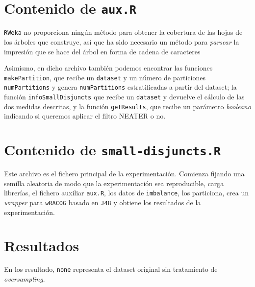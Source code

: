 \section{Contenido de \texttt{aux.R}}
\texttt{RWeka} no proporciona ningún método para obtener la cobertura de las hojas de los árboles que construye, así que
ha sido necesario un método para \textit{parsear} la impresión que se hace del árbol en forma de cadena de caracteres



Asimismo, en dicho archivo también podemos encontrar las funciones \texttt{makePartition}, que recibe un \texttt{dataset}
y un número de particiones \texttt{numPartitions} y genera \texttt{numPartitions} estratificadas a partir del dataset; la
función \texttt{infoSmallDisjuncts} que recibe un \texttt{dataset} y devuelve el cálculo de las dos medidas descritas, y 
la función \texttt{getResults}, que recibe un parámetro \textit{booleano} indicando si queremos aplicar el filtro NEATER
o no.



\section{Contenido de \texttt{small-disjuncts.R}}
Este archivo es el fichero principal de la experimentación. Comienza fijando una semilla aleatoria de modo que la experimentación
sea reproducible, carga librerías, el fichero auxiliar \texttt{aux.R}, los datos de \texttt{imbalance}, los particiona,
crea un \textit{wrapper} para \texttt{wRACOG} basado en \texttt{J48} y obtiene los resultados de la experimentación.

\section{Resultados}
En los resultado, \texttt{none} representa el dataset original sin tratamiento de \textit{oversampling}.
